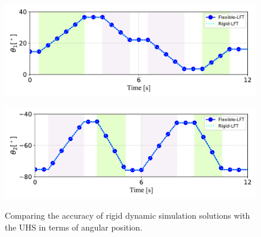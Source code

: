 \begin{figure}[ht]
    \centering
    \begin{minipage}{\textwidth}
        \centering
        \includegraphics[width=\textwidth]{LiftAngle.pdf}
         \label{fig:lift-boom}
    \end{minipage}
    \vspace{1em}  %
    \begin{minipage}{\textwidth}
        \centering
        \includegraphics[width=\textwidth]{TiltAngle.pdf}
         \label{fig:tilt-boom}
    \end{minipage}

    \caption{Comparing the accuracy of rigid dynamic simulation solutions with the UHS in terms of angular position.}
    \label{fig:comparison}
\end{figure}


